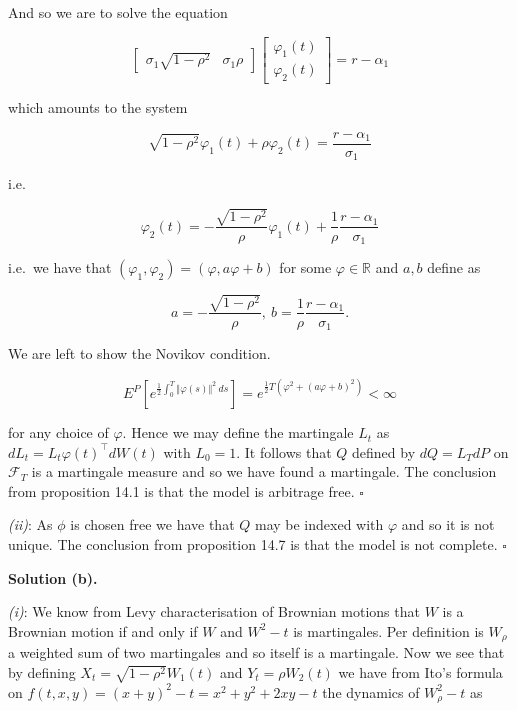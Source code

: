 \documentclass[
]{book}
\begin{document}
And so we are to solve the equation

\[
\begin{bmatrix}
\sigma_1\sqrt{1-\rho^2} & \sigma_1\rho
\end{bmatrix}
\begin{bmatrix}
\varphi_1(t)\\
\varphi_2(t)
\end{bmatrix}=r-\alpha_1
\]

which amounts to the system

\[
\sqrt{1-\rho^2}\varphi_1(t)+\rho\varphi_2(t)=\frac{r-\alpha_1}{\sigma_1}
\]

i.e.

\[
\varphi_2(t)=-\frac{\sqrt{1-\rho^2}}{\rho}\varphi_1(t)+\frac{1}{\rho}\frac{r-\alpha_1}{\sigma_1}
\]

i.e.~we have that \((\varphi_1,\varphi_2)=(\varphi,a\varphi+b)\) for some \(\varphi\in\mathbb{R}\) and \(a,b\) define as

\[
a=-\frac{\sqrt{1-\rho^2}}{\rho},\ b=\frac{1}{\rho}\frac{r-\alpha_1}{\sigma_1}.
\]

We are left to show the Novikov condition.

\[
E^P\left[e^{\frac{1}{2}\int_0^T \Vert \varphi(s)\Vert ^2\ ds}\right]=e^{\frac{1}{2}T (\varphi^2+(a\varphi+b)^2)}<\infty
\]

for any choice of \(\varphi\). Hence we may define the martingale \(L_t\) as \(dL_t=L_t\varphi(t)^\top dW(t)\) with \(L_0=1\). It follows that \(Q\) defined by \(dQ=L_TdP\) on \(\mathcal{F}_T\) is a martingale measure and so we have found a martingale. The conclusion from proposition 14.1 is that the model is arbitrage free. \(\square\)

\emph{(ii)}: As \(\phi\) is chosen free we have that \(Q\) may be indexed with \(\varphi\) and so it is not unique. The conclusion from proposition 14.7 is that the model is not complete. \(\square\)

\noindent\makebox[\linewidth]{\rule{\textwidth}{0.4pt}}

\textbf{Solution (b).}

\emph{(i)}: We know from Levy characterisation of Brownian motions that \(W\) is a Brownian motion if and only if \(W\) and \(W^2-t\) is martingales. Per definition is \(W_\rho\) a weighted sum of two martingales and so itself is a martingale. Now we see that by defining \(X_t=\sqrt{1-\rho^2}W_1(t)\) and \(Y_t=\rho W_2(t)\) we have from Ito's formula on \(f(t,x,y)=(x+y)^2-t=x^2+y^2+2xy-t\) the dynamics of \(W_\rho^2-t\) as
\end{document}
